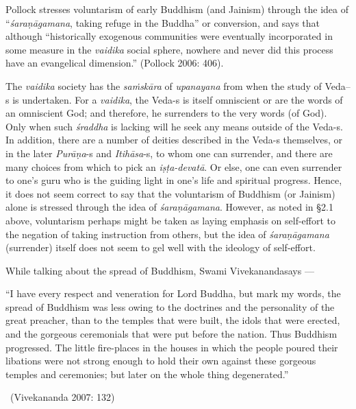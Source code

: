 Pollock stresses voluntarism of early Buddhism (and Jainism) through the idea of “\textit{śaraṇāgamana}, taking refuge in the Buddha” or conversion, and says that although “historically exogenous communities were eventually incorporated in some measure in the \textit{vaidika} social sphere, nowhere and never did this process have an evangelical dimension.” (Pollock 2006: 406).

The \textit{vaidika} society has the \textit{saṁskāra} of \textit{upanayana} from when the study of Veda--s is undertaken. For a \textit{vaidika}, the Veda-s is itself omniscient or are the words of an omniscient God; and therefore, he surrenders to the very words (of God). Only when such \textit{śraddha} is lacking will he seek any means outside of the Veda-s. In addition, there are a number of deities described in the Veda-s themselves, or in the later \textit{Purāṇa}-s and \textit{Itihāsa}-s, to whom one can surrender, and there are many choices from which to pick an \textit{iṣṭa-devatā}. Or else, one can even surrender to one’s guru who is the guiding light in one’s life and spiritual progress. Hence, it does not seem correct to say that the voluntarism of Buddhism (or Jainism) alone is stressed through the idea of \textit{śaraṇāgamana}. However, as noted in §2.1 above, voluntarism perhaps might be taken as laying emphasis on self-effort to the negation of taking instruction from others, but the idea of \textit{śaraṇāgamana} (surrender) itself does not seem to gel well with the ideology of self-effort.

While talking about the spread of Buddhism, Swami Vivekananda\break says —

\begin{myquote}
“I have every respect and veneration for Lord Buddha, but mark my words, the spread of Buddhism was less owing to the doctrines and the personality of the great preacher, than to the temples that were built, the idols that were erected, and the gorgeous ceremonials that were put before the nation. Thus Buddhism progressed. The little fire-places in the houses in which the people poured their libations were not strong enough to hold their own against these gorgeous temples and ceremonies; but later on the whole thing degenerated.” 

~\hfill (Vivekananda 2007: 132)
\end{myquote}

